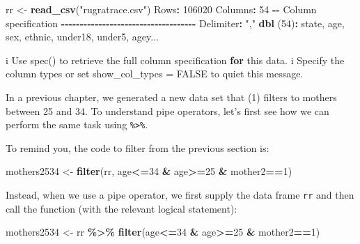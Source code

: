 \documentclass[
]{book}
\newenvironment{Shaded}{\begin{snugshade}}{\end{snugshade}}
\newcommand{\AttributeTok}[1]{\textcolor[rgb]{0.13,0.29,0.53}{#1}}
\newcommand{\ControlFlowTok}[1]{\textcolor[rgb]{0.13,0.29,0.53}{\textbf{#1}}}
\newcommand{\DecValTok}[1]{\textcolor[rgb]{0.00,0.00,0.81}{#1}}
\newcommand{\FunctionTok}[1]{\textcolor[rgb]{0.13,0.29,0.53}{\textbf{#1}}}
\newcommand{\NormalTok}[1]{#1}
\newcommand{\OtherTok}[1]{\textcolor[rgb]{0.56,0.35,0.01}{#1}}
\newcommand{\SpecialCharTok}[1]{\textcolor[rgb]{0.81,0.36,0.00}{\textbf{#1}}}
\newcommand{\StringTok}[1]{\textcolor[rgb]{0.31,0.60,0.02}{#1}}
\begin{document}
\begin{Shaded}
\begin{Highlighting}[]
\NormalTok{rr }\OtherTok{\textless{}{-}} \FunctionTok{read\_csv}\NormalTok{(}\StringTok{"rugratrace.csv"}\NormalTok{)}
\NormalTok{Rows}\SpecialCharTok{:} \DecValTok{106020}\NormalTok{ Columns}\SpecialCharTok{:} \DecValTok{54}
\SpecialCharTok{{-}{-}}\NormalTok{ Column specification }\SpecialCharTok{{-}{-}{-}{-}{-}{-}{-}{-}{-}{-}{-}{-}{-}{-}{-}{-}{-}{-}{-}{-}{-}{-}{-}{-}{-}{-}{-}{-}{-}{-}{-}{-}{-}{-}{-}{-}}
\NormalTok{Delimiter}\SpecialCharTok{:} \StringTok{","}
\FunctionTok{dbl}\NormalTok{ (}\DecValTok{54}\NormalTok{)}\SpecialCharTok{:}\NormalTok{ state, age, sex, ethnic, under18, under5, agey...}

\NormalTok{i Use }\StringTok{\textasciigrave{}}\AttributeTok{spec()}\StringTok{\textasciigrave{}}\NormalTok{ to retrieve the full column specification }\ControlFlowTok{for}\NormalTok{ this data.}
\NormalTok{i Specify the column types or set }\StringTok{\textasciigrave{}}\AttributeTok{show\_col\_types = FALSE}\StringTok{\textasciigrave{}}\NormalTok{ to quiet this message.}
\end{Highlighting}
\end{Shaded}

In a previous chapter, we generated a new data set that (1) filters to mothers between 25 and 34. To understand pipe operators, let's first see how we can perform the same task using \texttt{\%\textgreater{}\%}.

To remind you, the code to filter from the previous section is:

\begin{Shaded}
\begin{Highlighting}[]
\NormalTok{mothers2534 }\OtherTok{\textless{}{-}} \FunctionTok{filter}\NormalTok{(rr, age}\SpecialCharTok{\textless{}=}\DecValTok{34} \SpecialCharTok{\&}\NormalTok{ age}\SpecialCharTok{\textgreater{}=}\DecValTok{25} \SpecialCharTok{\&}\NormalTok{ mother2}\SpecialCharTok{==}\DecValTok{1}\NormalTok{)}
\end{Highlighting}
\end{Shaded}

Instead, when we use a pipe operator, we first supply the data frame \texttt{rr} and then call the function (with the relevant logical statement):

\begin{Shaded}
\begin{Highlighting}[]
\NormalTok{mothers2534 }\OtherTok{\textless{}{-}}\NormalTok{ rr }\SpecialCharTok{\%\textgreater{}\%} \FunctionTok{filter}\NormalTok{(age}\SpecialCharTok{\textless{}=}\DecValTok{34} \SpecialCharTok{\&}\NormalTok{ age}\SpecialCharTok{\textgreater{}=}\DecValTok{25} \SpecialCharTok{\&}\NormalTok{ mother2}\SpecialCharTok{==}\DecValTok{1}\NormalTok{)}
\end{Highlighting}
\end{Shaded}
\end{document}
